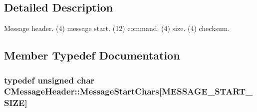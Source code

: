\subsection{Detailed Description}
Message header. (4) message start. (12) command. (4) size. (4) checksum. 

\subsection{Member Typedef Documentation}
\hypertarget{class_c_message_header_a0d0eeb540cbf4087973f6652ad61878f}{}
\subsubsection[{Message\+Start\+Chars}]{\setlength{\rightskip}{0pt plus 5cm}typedef unsigned char C\+Message\+Header\+::\+Message\+Start\+Chars\mbox{[}{\bf M\+E\+S\+S\+A\+G\+E\+\_\+\+S\+T\+A\+R\+T\+\_\+\+S\+I\+Z\+E}\mbox{]}}\label{class_c_message_header_a0d0eeb540cbf4087973f6652ad61878f}


